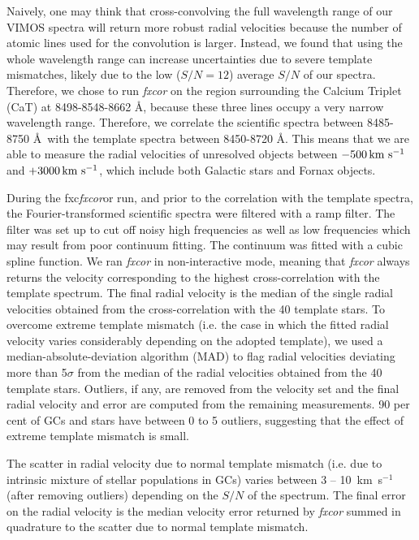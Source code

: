 \documentclass[useAMS,usenatbib]{mn2e}
\newcommand{\kms}{\mbox{\,km~s$^{-1}$}}
\begin{document}
Naively, one may think that cross-convolving the full wavelength range of our 
VIMOS spectra will return more robust radial velocities because the number of 
atomic lines used for the convolution is larger. Instead, we found that using 
the whole wavelength range can increase uncertainties due to severe template 
mismatches, likely due to the low ($S/N = 12$) average $S/N$ of our spectra. 
Therefore, we chose to run {\it fxcor} on the region surrounding the Calcium 
Triplet (CaT) at 8498-8548-8662 \AA , because these three lines occupy a very 
narrow wavelength range. Therefore, we correlate the scientific spectra between 
8485-8750 \AA\ with the template spectra between 8450-8720 \AA . This means 
that we are able to measure the radial velocities of unresolved objects between 
$-500 \kms$ and $+3000\kms$, which include both Galactic stars and Fornax 
objects.   

During the fxc{\it fxcor}or run, and prior to the correlation with the template 
spectra, the Fourier-transformed scientific spectra were filtered with a ramp 
filter. The filter was set up to cut off noisy high frequencies as well as low 
frequencies which may result from poor continuum fitting. The continuum was 
fitted with a cubic spline function.
We ran {\it fxcor} in non-interactive mode, meaning that {\it fxcor} always 
returns the velocity corresponding to the highest cross-correlation with the 
template spectrum. The final radial velocity is the median of the single radial 
velocities obtained from the cross-correlation with the 40 template stars. 
To overcome extreme template mismatch (i.e. the case in which the fitted radial 
velocity varies considerably depending on the adopted template), we used a 
median-absolute-deviation algorithm (MAD) to flag radial velocities deviating 
more than 5$\sigma$ from the median of the radial velocities obtained from the 
40 template stars. Outliers, if any, are removed from the velocity set and the 
final radial velocity and error are computed from the remaining measurements. 
90 per cent of GCs and stars have between 0 to 5 outliers, suggesting that the 
effect of extreme template mismatch is small. 

The scatter in radial velocity due to normal template mismatch (i.e. due to 
intrinsic mixture of stellar populations in GCs) varies between 3 -- 10 \kms 
(after removing outliers) depending on the $S/N$ of the spectrum. The final 
error on the radial velocity is the median velocity error returned by {\it 
fxcor} summed in quadrature to the scatter due to normal template mismatch. 
\end{document}
